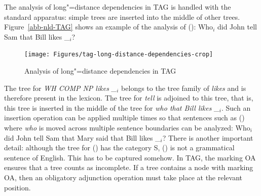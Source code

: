 The analysis of long"=distance dependencies in TAG is handled with the standard apparatus: simple trees are inserted
into the middle of other trees. Figure~\vref{abb-nld-TAG} shows an example of the analysis of ():
\ea
Who$_i$ did John tell Sam that Bill likes \_$_i$?
\z
%
\begin{figure}
\texttt{[image: Figures/tag-long-distance-dependencies-crop]}
\caption{\label{abb-nld-TAG}Analysis of long"=distance dependencies in TAG}
\end{figure}%
The tree for \emph{WH COMP NP likes \_$_i$} belongs to the tree family of \emph{likes} and is therefore
present in the lexicon.
The tree for \emph{tell} is adjoined to this tree, that is, this tree is inserted in the middle of the tree for
\emph{who that Bill likes \_$_i$}. Such an insertion operation can be applied multiple times so that sentences such as ()
where \emph{who} is moved across multiple sentence boundaries can be analyzed:
\ea 
Who$_i$ did John tell Sam that Mary said that Bill likes \_$_i$?
\z
%
There is another important detail: although the tree for () has the category S, () is not a grammatical
sentence of English.
\z
This has to be captured somehow. In TAG, the marking OA ensures that a tree counts as incomplete. If
a tree contains a node with marking OA, then an obligatory adjunction
operation must take place at the relevant position. 


